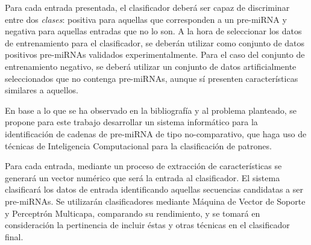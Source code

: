\documentclass[12pt,bibliography=oldstyle,DIV=12,parskip=full-]{scrartcl}
\begin{document}
Para cada entrada presentada, el clasificador deberá ser capaz de
discriminar entre dos \emph{clases}: positiva para aquellas que
corresponden a un pre-miRNA y negativa para aquellas entradas que no
lo son. A la hora de seleccionar los datos de entrenamiento para el
clasificador, se deberán utilizar como conjunto de datos positivos
pre-miRNAs validados experimentalmente. Para el caso del conjunto de
entrenamiento negativo, se deberá utilizar un conjunto de datos
artificialmente seleccionados que no contenga pre-miRNAs, aunque sí
presenten características similares a aquellos.

En base a lo que se ha observado en la bibliografía y al problema
planteado, se propone para este trabajo desarrollar un sistema
informático para la identificación de cadenas de pre-miRNA de tipo
no-comparativo, que haga uso de técnicas de Inteligencia Computacional
para la clasificación de patrones.

Para cada entrada, mediante un proceso de extracción de
características se generará un vector numérico que será la entrada al
clasificador.  El sistema clasificará los datos de entrada
identificando aquellas secuencias candidatas a ser pre-miRNAs.  Se
utilizarán clasificadores mediante Máquina de Vector de Soporte y
Perceptrón Multicapa, comparando su rendimiento, y se tomará en
consideración la pertinencia de incluir éstas y otras técnicas en el
clasificador final.


\end{document}
